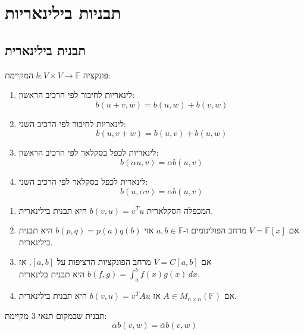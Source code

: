 \documentclass{tstextbook}
\begin{document}
\section{תבניות בילינאריות}

\subsection{תבנית בילינארית}

\begin{definition}
פונקציה \(b:V\times V\rightarrow \mathbb F\) המקיימת:

  \begin{enumerate}
    \item לינאריות לחיבור לפי הרכיב הראשון: 
$$b(u+v,w)=b(u,w)+b(v,w)$$


    \item לינאריות לחיבור לפי הרכיב השני: 
$$b(u,v+w)=b(u,v)+b(u,w)$$


    \item לינאריות לכפל בסקלאר לפי הרכיב הראשון: 
$$b(\alpha u,v)=\alpha b(u,v)$$


    \item לינארית לכפל בסקלאר לפי הרכיב השני: 
$$b\left( u,\alpha v \right)=\alpha b(u,v)$$


  \end{enumerate}
\end{definition}
\begin{example}
  \begin{enumerate}
    \item המכפלה הסקלארית \(b(v,u)=v^{T}u\) היא תבנית בילינארית. 


    \item אם \(V=\mathbb{F} [x]\) מרחב הפולינומים ו-\(a,b \in \mathbb{F}\) אזי \(b(p,q)=p(a)q(b)\) היא תבנית בילינארית. 


    \item אם \(V=C[a,b]\) מרחב הפונקציות הרציפות על \([a,b]\), אז \(b(f,g)=\int_{a}^{b} f(x)g(x) \, dx\) היא תבנית בלינארית. 


    \item אם \(A \in M_{n\times n}\left( \mathbb{F}  \right)\) אז \(b(v,u)=v^{T}Au\) היא תבנית בילינארית. 


  \end{enumerate}
\end{example}
\begin{definition}
תבנית שבמקום תנאי 3 מקיימת:
$$ \alpha b(v, w) = \overline \alpha b( v, w )$$

\end{definition}
\end{document}
